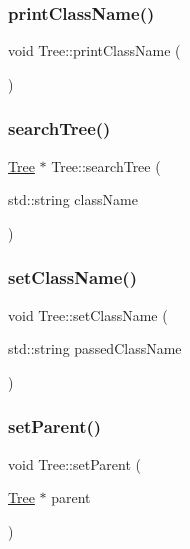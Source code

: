 \mbox{\label{class_tree_a745082a21d2f7ce4952a6d4d8def516e}} 
\subsubsection{\texorpdfstring{print\+Class\+Name()}{printClassName()}}
{\footnotesize\ttfamily void Tree\+::print\+Class\+Name (\begin{DoxyParamCaption}{ }\end{DoxyParamCaption})}

\mbox{\label{class_tree_ac010956e6b34ee7137ccaf79b5f529a7}} 
\subsubsection{\texorpdfstring{search\+Tree()}{searchTree()}}
{\footnotesize\ttfamily \hyperlink{class_tree}{Tree} $\ast$ Tree\+::search\+Tree (\begin{DoxyParamCaption}\item[{std\+::string}]{class\+Name }\end{DoxyParamCaption})}

\mbox{\label{class_tree_ac718ef932f2a48d178a4a5ee372fd847}} 
\subsubsection{\texorpdfstring{set\+Class\+Name()}{setClassName()}}
{\footnotesize\ttfamily void Tree\+::set\+Class\+Name (\begin{DoxyParamCaption}\item[{std\+::string}]{passed\+Class\+Name }\end{DoxyParamCaption})}

\mbox{\label{class_tree_aa299141dce83b8cae4679bf203fc8241}} 
\subsubsection{\texorpdfstring{set\+Parent()}{setParent()}}
{\footnotesize\ttfamily void Tree\+::set\+Parent (\begin{DoxyParamCaption}\item[{\hyperlink{class_tree}{Tree} $\ast$}]{parent }\end{DoxyParamCaption})}



